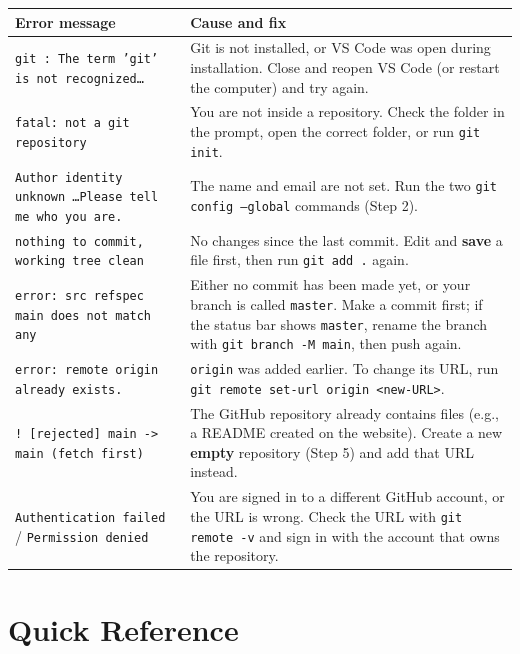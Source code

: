 \documentclass[11pt,a4paper]{article}
\newcommand{\code}[1]{\texttt{#1}}
\begin{document}
\begin{center}
\renewcommand{\arraystretch}{1.35}
\small
\begin{tabularx}{\linewidth}{|p{5.3cm}|X|}
\hline
\textbf{Error message} & \textbf{Cause and fix} \\ \hline
\code{git : The term 'git' is not recognized\ldots} & Git is not installed, or VS Code was open during installation. Close and reopen VS Code (or restart the computer) and try again. \\ \hline
\code{fatal: not a git repository} & You are not inside a repository. Check the folder in the prompt, open the correct folder, or run \code{git init}. \\ \hline
\code{Author identity unknown \ldots Please tell me who you are.} & The name and email are not set. Run the two \code{git config --global} commands (Step 2). \\ \hline
\code{nothing to commit, working tree clean} & No changes since the last commit. Edit and \textbf{save} a file first, then run \code{git add .} again. \\ \hline
\code{error: src refspec main does not match any} & Either no commit has been made yet, or your branch is called \code{master}. Make a commit first; if the status bar shows \code{master}, rename the branch with \code{git branch -M main}, then push again. \\ \hline
\code{error: remote origin already exists.} & \code{origin} was added earlier. To change its URL, run \code{git remote set-url origin <new-URL>}. \\ \hline
\code{! [rejected] main -> main (fetch first)} & The GitHub repository already contains files (e.g., a README created on the website). Create a new \textbf{empty} repository (Step 5) and add that URL instead. \\ \hline
\code{Authentication failed} / \code{Permission denied} & You are signed in to a different GitHub account, or the URL is wrong. Check the URL with \code{git remote -v} and sign in with the account that owns the repository. \\ \hline
\end{tabularx}
\end{center}

\section{Quick Reference}
\end{document}
